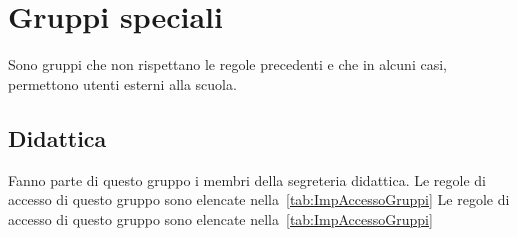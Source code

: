 \section{Gruppi speciali}
Sono gruppi che non rispettano le regole precedenti e che in alcuni casi, permettono utenti esterni alla scuola.
\subsection{Didattica}
Fanno parte di questo gruppo i membri della segreteria didattica. Le  regole di accesso di questo gruppo sono elencate nella~\cref{tab:ImpAccessoGruppi}
Le  regole di accesso di questo gruppo sono elencate nella~\cref{tab:ImpAccessoGruppi}
